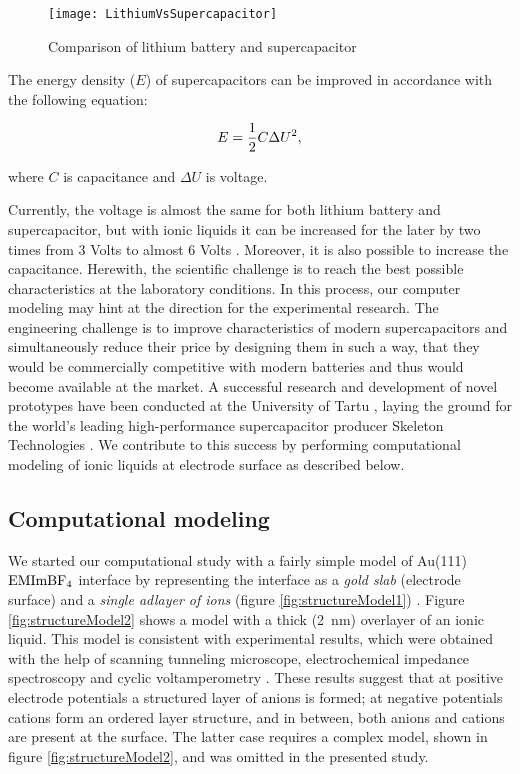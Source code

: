 \documentclass[a4paper,10pt]{article}
\begin{document}
\begin{figure}
\centering
\texttt{[image: LithiumVsSupercapacitor]}
\caption{Comparison of lithium battery and supercapacitor}
\label{fig:LitVsSuperCap}
\end{figure}

The energy density ($E$) of supercapacitors can be improved in accordance with the following equation:

\begin{equation} 
\label{eq:energy}
\begin{centering}
E = \frac{1}{2}C\Delta U^2,
\end{centering}
\end{equation}

\noindent where $C$ is capacitance and $\Delta U$ is voltage.

Currently, the voltage is almost the same for both lithium battery and supercapacitor, but with ionic liquids it can be increased for the later by two times from 3 Volts to almost 6 Volts \cite{lewandowski2004}. Moreover, it is also possible to increase the capacitance. Herewith, the scientific challenge is to reach the best possible characteristics at the laboratory conditions. In this process, our computer modeling may hint at the direction for the experimental research. The engineering challenge is to improve characteristics of modern supercapacitors and simultaneously reduce their price by designing them in such a way, that they would be commercially competitive with modern batteries and thus would become available at the market. A successful research and development of novel prototypes have been conducted at the University of Tartu \cite{lust2003,kurig2011}, laying the ground for the world's leading high-performance supercapacitor producer Skeleton Technologies \cite{tartutech}. We contribute to this success by performing computational modeling of ionic liquids at electrode surface as described below.

\subsection{Computational modeling}



We started our computational study with a fairly simple model of Au(111) \textbar~$\textnormal{EMImBF}_4$ interface by representing the interface as a \textit{gold slab} (electrode surface) and a \textit{single adlayer of ions} (figure \ref{fig:structureModel1}) \cite{ivanistsev2012}. Figure \ref{fig:structureModel2} shows a model with a thick (2~nm) overlayer of an ionic liquid. This model is consistent with experimental results, which were obtained with the help of scanning tunneling microscope, electrochemical impedance spectroscopy and cyclic voltamperometry \cite{pan2006,gnahm2010}. These results suggest that at positive electrode potentials a structured layer of anions is formed; at negative potentials cations form an ordered layer structure, and in between, both anions and cations are present at the surface. The latter case requires a complex model, shown in figure \ref{fig:structureModel2}, and was omitted in the presented study.
\end{document}
